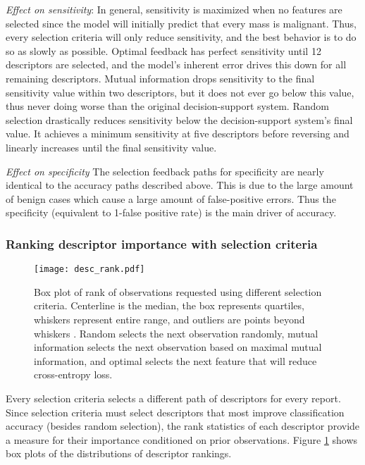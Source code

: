 \emph{Effect on sensitivity}:
In general, sensitivity is maximized when no features are selected since the model will initially predict that every mass is malignant. Thus, every selection criteria will only reduce sensitivity, and the best behavior is to do so as slowly as possible. Optimal feedback has perfect sensitivity until 12 descriptors are selected, and the model's inherent error drives this down for all remaining descriptors. Mutual information drops sensitivity to the final sensitivity value within two descriptors, but it does not ever go below this value, thus never doing worse than the original decision-support system. Random selection drastically reduces sensitivity below the decision-support system's final value. It achieves a minimum sensitivity at five descriptors before reversing and linearly increases until the final sensitivity value.

\emph{Effect on specificity}
The selection feedback paths for specificity are nearly identical to the accuracy paths described above. This is due to the large amount of benign cases which cause a large amount of false-positive errors. Thus the specificity (equivalent to 1-false positive rate) is the main driver of accuracy.


\subsubsection{Ranking descriptor importance with selection criteria}

\begin{figure}[h]
	\centering
	\texttt{[image: desc\_rank.pdf]}
	\caption[Ranking descriptor importance with selection criteria]{Box plot of rank of observations requested using different selection criteria. Centerline is the median, the box represents quartiles, whiskers represent entire range, and outliers are points beyond whiskers . Random selects the next observation randomly, mutual information selects the next observation based on maximal mutual information, and optimal selects the next feature that will reduce cross-entropy loss.}
	\label{fig:feedback_mammo_ranks}
\end{figure}

Every selection criteria selects a different path of descriptors for every report. Since selection criteria must select descriptors that most improve classification accuracy (besides random selection), the rank statistics of each descriptor provide a measure for their importance conditioned on prior observations. Figure \ref{fig:feedback_mammo_ranks} shows box plots of the distributions of descriptor rankings.


